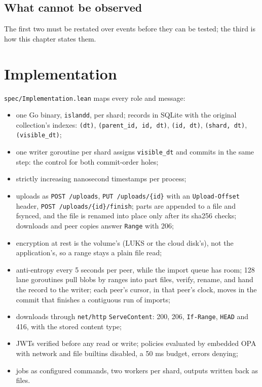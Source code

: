 \documentclass[11pt,oneside]{book}
\providecommand{\tightlist}{\setlength{\itemsep}{0pt}\setlength{\parskip}{0pt}}
\begin{document}
\section{What cannot be observed}


The first two must be restated over events before they can be tested; the third
is how this chapter states them.

\chapter{Implementation}
\texttt{spec/Implementation.lean} maps every role and message:
\begin{itemize}\tightlist
\item one Go binary, \texttt{islandd}, per shard; records in SQLite with the
  original collection's indexes: \texttt{(dt)}, \texttt{(parent\_id, id, dt)},
  \texttt{(id, dt)}, \texttt{(shard, dt)}, \texttt{(visible\_dt)};
\item one writer goroutine per shard assigns \texttt{visible\_dt} and commits in
  the same step: the control for both commit-order holes;
\item strictly increasing nanosecond timestamps per process;
\item uploads as \texttt{POST /uploads}, \texttt{PUT /uploads/\{id\}} with an
  \texttt{Upload-Offset} header, \texttt{POST /uploads/\{id\}/finish}; parts are
  appended to a file and fsynced, and the file is renamed into place only after
  its sha256 checks; downloads and peer copies answer \texttt{Range} with 206;
\item encryption at rest is the volume's (LUKS or the cloud disk's), not the
  application's, so a range stays a plain file read;
\item anti-entropy every 5 seconds per peer, while the import queue has room;
  128 lane goroutines pull blobs by ranges into part files, verify, rename, and
  hand the record to the writer; each peer's cursor, in that peer's clock, moves in the commit that finishes a contiguous run of imports;
\item downloads through \texttt{net/http} \texttt{ServeContent}: 200, 206,
  \texttt{If-Range}, \texttt{HEAD} and 416, with the stored content type;
\item JWTs verified before any read or write; policies evaluated by embedded OPA
  with network and file builtins disabled, a 50 ms budget, errors denying;
\item jobs as configured commands, two workers per shard, outputs written back as
  files.
\end{itemize}
\end{document}

